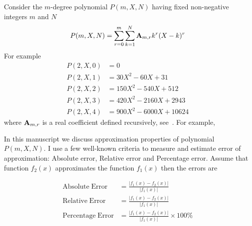 Consider the $m$-degree polynomial $P(m, X, N)$ having fixed non-negative integers $m$ and $N$
\begin{align*}
    P(m,X,N) = \sum_{r=0}^{m} \sum_{k=1}^{N} {\mathbf{A}} \sb{m,r} k^r (X-k)^r
\end{align*}
For example
\begin{align*}
    P(2,X,0) &= 0 \\
    P(2,X,1) &= 30X^2 - 60X + 31 \\
    P(2,X,2) &= 150X^2 - 540X + 512 \\
    P(2,X,3) &= 420X^2 - 2160X + 2943 \\
    P(2,X,4) &= 900X^2 - 6000X + 10624
\end{align*}
where ${\mathbf{A}} \sb{m,r}$ is a real coefficient defined recursively, see~\cite{alekseyev2018mathoverflow,
    on_the_link_between_binomial_theorem_and_discrete_convolution, unusual_identity_for_odd_powers,
    history_and_overview_of_polynomial_p}.
For example,


In this manuscript we discuss approximation properties of polynomial $P(m,X,N)$.
I use a few well-known criteria to measure and estimate error of approximation: Absolute error, Relative error and
Percentage error.
Assume that function $f_2(x)$ approximates the function $f_1 (x)$ then the errors are

\begin{align*}
    \mathrm{Absolute \; Error}   &= \frac{\lvert f_1(x) - f_2(x) \rvert}{\lvert f_1(x) \rvert} \\
    \mathrm{Relative \; Error}   &= \frac{\lvert f_1(x) - f_2(x) \rvert}{\lvert f_1(x) \rvert} \\
    \mathrm{Percentage \; Error} &= \frac{\lvert f_1(x) - f_2(x) \rvert}{\lvert f_1(x) \rvert} \times 100\%
\end{align*}

